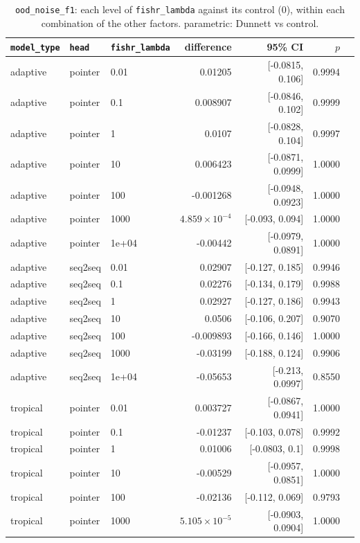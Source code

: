 \documentclass[10pt]{article}
\begin{document}
{\small
\begin{longtable}{lllrrrl}
\caption{\texttt{ood\_noise\_f1}: each level of \texttt{fishr\_lambda} against its control (0), within each combination of the other factors. parametric: Dunnett vs control.}\label{tab:control-ood_noise_f1}\\
\toprule
\texttt{model\_type} & \texttt{head} & \texttt{fishr\_lambda} & difference & 95\% CI & $p$ & \\
\midrule
\endhead
adaptive & pointer & 0.01 & 0.01205 & [-0.0815, 0.106] & 0.9994 & \\
adaptive & pointer & 0.1 & 0.008907 & [-0.0846, 0.102] & 0.9999 & \\
adaptive & pointer & 1 & 0.0107 & [-0.0828, 0.104] & 0.9997 & \\
adaptive & pointer & 10 & 0.006423 & [-0.0871, 0.0999] & 1.0000 & \\
adaptive & pointer & 100 & -0.001268 & [-0.0948, 0.0923] & 1.0000 & \\
adaptive & pointer & 1000 & $4.859\times10^{-4}$ & [-0.093, 0.094] & 1.0000 & \\
adaptive & pointer & 1e+04 & -0.00442 & [-0.0979, 0.0891] & 1.0000 & \\
adaptive & seq2seq & 0.01 & 0.02907 & [-0.127, 0.185] & 0.9946 & \\
adaptive & seq2seq & 0.1 & 0.02276 & [-0.134, 0.179] & 0.9988 & \\
adaptive & seq2seq & 1 & 0.02927 & [-0.127, 0.186] & 0.9943 & \\
adaptive & seq2seq & 10 & 0.0506 & [-0.106, 0.207] & 0.9070 & \\
adaptive & seq2seq & 100 & -0.009893 & [-0.166, 0.146] & 1.0000 & \\
adaptive & seq2seq & 1000 & -0.03199 & [-0.188, 0.124] & 0.9906 & \\
adaptive & seq2seq & 1e+04 & -0.05653 & [-0.213, 0.0997] & 0.8550 & \\
tropical & pointer & 0.01 & 0.003727 & [-0.0867, 0.0941] & 1.0000 & \\
tropical & pointer & 0.1 & -0.01237 & [-0.103, 0.078] & 0.9992 & \\
tropical & pointer & 1 & 0.01006 & [-0.0803, 0.1] & 0.9998 & \\
tropical & pointer & 10 & -0.00529 & [-0.0957, 0.0851] & 1.0000 & \\
tropical & pointer & 100 & -0.02136 & [-0.112, 0.069] & 0.9793 & \\
tropical & pointer & 1000 & $5.105\times10^{-5}$ & [-0.0903, 0.0904] & 1.0000 & \\

\end{longtable}}
\end{document}
